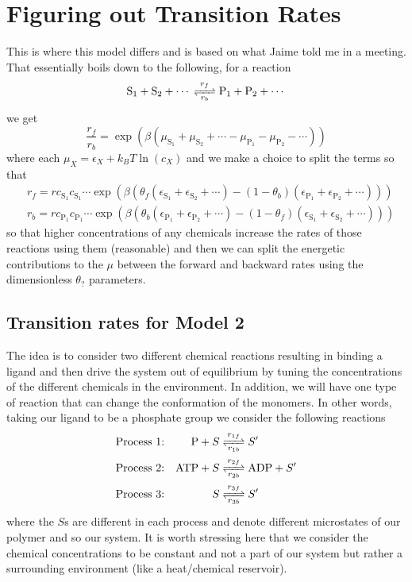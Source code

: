 \documentclass[11pt]{article}
\begin{document}
\section{Figuring out Transition Rates}
This is where this model differs and is based on what Jaime told me in a meeting.
That essentially boils down to the following, for a reaction
\begin{equation}
    \ce{S_1 + S_2 + $\cdots$ <=>[$r_f$][$r_b$] P_1 + P_2 + $\cdots$}
\end{equation}
we get
\begin{equation}
    \frac{r_f}{r_b} = \exp(\beta(\mu_{\text{S}_1} + \mu_{\text{S}_2} + \cdots - \mu_{\text{P}_1} - \mu_{\text{P}_2} - \cdots))
\end{equation}
where each $\mu_X = \epsilon_X + \si{k_B}T\ln(c_X)$ and we make a choice to split the terms so that
\begin{align}
    &r_f = r c_{\text{S}_1}c_{\text{S}_1}\cdots \exp(\beta(\theta_f(\epsilon_{\text{S}_1} + \epsilon_{\text{S}_2} + \cdots) - (1-\theta_b)(\epsilon_{\text{P}_1} + \epsilon_{\text{P}_2} + \cdots))) \\
    &r_b = r c_{\text{P}_1}c_{\text{P}_1}\cdots \exp(\beta(\theta_b(\epsilon_{\text{P}_1} + \epsilon_{\text{P}_2} + \cdots) - (1-\theta_f)(\epsilon_{\text{S}_1} + \epsilon_{\text{S}_2} + \cdots)))
\end{align}
so that higher concentrations of any chemicals increase the rates of those reactions using them (reasonable) and then we can split the energetic contributions to the $\mu$ between the forward and backward rates using the dimensionless $\theta_?$ parameters.

\subsection{Transition rates for Model 2}
The idea is to consider two different chemical reactions resulting in binding a ligand and then drive the system out of equilibrium by tuning the concentrations of the different chemicals in the environment.
In addition, we will have one type of reaction that can change the conformation of the monomers.
In other words, taking our ligand to be a phosphate group we consider the following reactions
\begin{align}
    \text{Process 1:} && \ce{P + $S$ &<=>[$r_{1f}$][$r_{1b}$] $S'$} \\
    \text{Process 2:} && \ce{ATP + $S$ &<=>[$r_{2f}$][$r_{2b}$] ADP + $S'$} \\
    \text{Process 3:} && \ce{$S$ &<=>[$r_{3f}$][$r_{3b}$] $S'$}
\end{align}
where the $S$s are different in each process and denote different microstates of our polymer and so our system.
It is worth stressing here that we consider the chemical concentrations to be constant and not a part of our system but rather a surrounding environment (like a heat/chemical reservoir).
\end{document}
